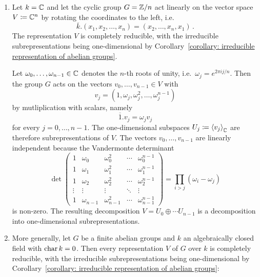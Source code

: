 \begin{example}
  \label{example: complex representations of finite abelian groups are completely reducible}
  \begin{enumerate}
    \item
      Let $k = \mathbb{C}$ and let the cyclic group $G = \mathbb{Z}/n$ act linearly on the vector space $V \coloneqq \mathbb{C}^n$ by rotating the coordinates to the left, i.e.
      \[
          \overline{k}.(x_1, x_2, \dotsc, x_n)
        = (x_2, \dotsc, x_n, x_1) \,.
      \]
      The representation $V$ is completely reducible, with the irreducible subrepresentations being one-dimensional by Corollary~\ref{corollary: irreducible representation of abelian groups}.
      
      Let $\omega_0, \dotsc, \omega_{n-1} \in \mathbb{C}$ denotes the $n$-th roots of unity, i.e.\ $\omega_j = e^{2 \pi i j/n}$.
      Then the group $G$ acts on the vectors $v_0, \dotsc, v_{n-1} \in V$ with
      \[
          v_j
        = (1, \omega_j, \omega_j^2, \dotsc, \omega_j^{n-1})
      \]
      by mutliplication with scalars, namely
      \[
          \overline{1}.v_j
        = \omega_j v_j
      \]
      for every $j = 0, \dotsc, n-1$.
      The one-dimensional subspaces $U_j \coloneqq \left\langle  v_j  \right\rangle_{\mathbb{C}}$ are therefore subrepresentations of $V$.
      The vectors $v_0, \dotsc, v_{n-1}$ are linearly independent because the Vandermonte determinant
      \[
          \det
          \begin{pmatrix}
            1       & \omega_0      & \omega_0^2      & \cdots  & \omega_0^{n-1}      \\
            1       & \omega_1      & \omega_1^2      & \cdots  & \omega_1^{n-1}      \\
            1       & \omega_2      & \omega_2^2      & \cdots  & \omega_2^{n-1}      \\
            \vdots  & \vdots        & \vdots          & \ddots  & \vdots              \\
            1       & \omega_{n-1}  & \omega_{n-1}^2  & \cdots  & \omega_{n-1}^{n-1}
          \end{pmatrix}
        = \prod_{i > j} (\omega_i - \omega_j)
      \]
      is non-zero.
      The resulting decomposition $V = U_0 \oplus \dotsb U_{n-1}$ is a decomposition into one-dimensional subrepresentations.
    \item
      More generally, let $G$ be a finite abelian groups and $k$ an algebraically closed field with $\operatorname{char} k = 0$.
      Then every representation $V$ of $G$ over $k$ is completely reducible, with the irreducible subrepresentations being one-dimensional by Corollary~\ref{corollary: irreducible representation of abelian groups}:
    

\end{enumerate}
\end{example}
